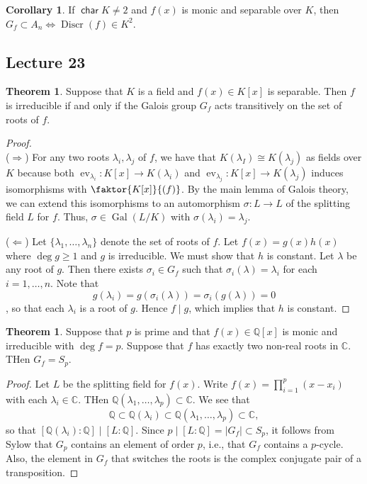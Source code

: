 \documentclass[10pt,letterpaper,cm]{nupset}
\theoremstyle{definition}
\theoremstyle{theorem}
\newtheorem{theorem}[definition]{Theorem}
\newtheorem{corollary}[definition]{Corollary}
\theoremstyle{remark}
\newcommand{\C}{\mathbb C}
\newcommand{\Q}{\mathbb Q}
\newcommand{\1}{\mathbf{1}}
\newcommand{\0}{\vec 0}
\DeclareMathOperator{\Char}{\mathsf{char}}
\DeclareMathOperator{\gal}{Gal}
\DeclareMathOperator{\ev}{ev}
\DeclareMathOperator{\disc}{Discr}
\begin{document}
\begin{corollary}
If $\Char{K} \ne 2$ and $f(x)$ is monic and separable over $K$, then $G_f \subset A_n \iff \disc(f) \in K^2$. 
\end{corollary}

\subsection{Lecture 23}

\begin{theorem}
Suppose that $K$ is a field and $f(x) \in K[x]$ is separable. Then $f$ is irreducible if and only if the Galois group $G_f$ acts transitively on the set of roots of $f$.  
\end{theorem}
\begin{proof} $ $
\\ ($\Longrightarrow$) For any two roots $\lambda_i, \lambda_j$ of $f$, we have that $K(\lambda_I) \cong K(\lambda_j)$ as fields over $K$ because both $\ev_{\lambda_i} : K[x] \to K(\lambda_i)$ and $\ev_{\lambda_j} : K[x] \to K(\lambda_j)$ induces isomorphisms with $\faktor{K[x]}{(f)}$. By the main lemma of Galois theory, we can extend this isomorphisms to an automorphism $\sigma : L \to L$ of the splitting field $L$ for $f$. Thus, $\sigma \in \gal(L/K)$ with $\sigma(\lambda_i) = \lambda_j$. 

\medskip


($\Longleftarrow$) Let $\{\lambda_1, \ldots, \lambda_n\}$ denote the set of roots of $f$. Let $f(x) = g(x)h(x)$ where $\deg{g} \geq 1$ and $g$ is irreducible. We must show that $h$ is constant. Let $\lambda$ be any root of $g$. Then there exists $\sigma_i \in G_f$ such that $\sigma_i(\lambda) = \lambda_i$ for each $i=1, \ldots, n$. Note that $$g(\lambda_i) = g(\sigma_i(\lambda))= \sigma_i(g(\lambda)) =0$$, so that each $\lambda_i$ is a root of $g$. Hence $f \mid g$, which implies that $h$ is constant. 
\end{proof}

\begin{theorem}
Suppose that $p$ is prime and that $f(x) \in \Q[x]$ is monic and irreducible with $\deg{f} =p$. Suppose that $f$ has exactly two non-real roots in $\C$. THen $G_f = S_p$.
\end{theorem}
\begin{proof}
Let $L$ be the splitting field for $f(x)$. Write $f(x) = \prod_{i=1}^p(x- x_i)$ with each $\lambda_i \in \C$. THen $\Q(\lambda_1, \ldots, \lambda_p) \subset \C$. We see that $$ \Q \subset \Q(\lambda_i)  \subset \Q(\lambda_1, \ldots, \lambda_p) \subset \C,$$ so that $[\Q(\lambda_i) : \Q] \mid [L : \Q]$.  Since $p \mid [L: \Q] = |G_f| \subset S_p$, it follows from Sylow that $G_p$ contains an element of order $p$, i.e., that $G_f$ contains a $p$-cycle. Also, the element in $G_f$ that switches the roots is the complex conjugate pair of a transposition.
\end{proof}
\end{document}

